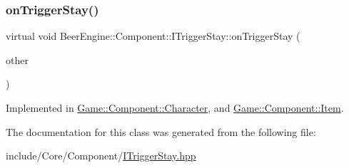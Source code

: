 \subsubsection{\texorpdfstring{on\+Trigger\+Stay()}{onTriggerStay()}}
{\footnotesize\ttfamily virtual void Beer\+Engine\+::\+Component\+::\+I\+Trigger\+Stay\+::on\+Trigger\+Stay (\begin{DoxyParamCaption}\item[{\mbox{\hyperlink{class_beer_engine_1_1_component_1_1_a_collider}{A\+Collider}} $\ast$}]{other }\end{DoxyParamCaption})\hspace{0.3cm}{\ttfamily [pure virtual]}}



Implemented in \mbox{\hyperlink{class_game_1_1_component_1_1_character_ab0ac4d77a9403cded5c52d77121a625c}{Game\+::\+Component\+::\+Character}}, and \mbox{\hyperlink{class_game_1_1_component_1_1_item_a02230f3771a83e4a77035cb0ec4c04be}{Game\+::\+Component\+::\+Item}}.



The documentation for this class was generated from the following file\+:\begin{DoxyCompactItemize}
\item 
include/\+Core/\+Component/\mbox{\hyperlink{_i_trigger_stay_8hpp}{I\+Trigger\+Stay.\+hpp}}\end{DoxyCompactItemize}
